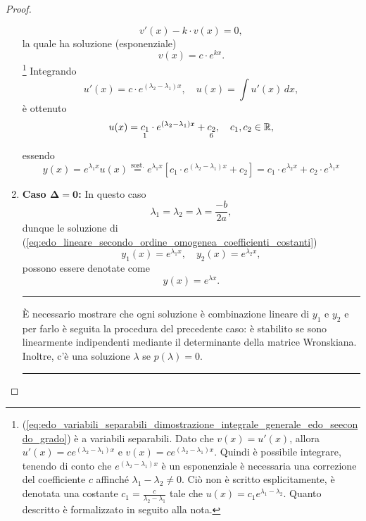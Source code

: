 \begin{proof}
\begin{enumerate}
\begin{equation}
			v'(x) - k \cdot v(x)=0,
		\end{equation}
		la quale ha soluzione (esponenziale)
		\begin{equation*}
			v(x) = c \cdot e^{kx}.
		\end{equation*}
		\footnote{(\ref{eq:edo_variabili_separabili_dimostrazione_integrale_generale_edo_seecondo_grado}) è a variabili separabili. Dato che $v(x)=u'(x)$, allora $u'(x)=ce^{(\lambda_2-\lambda_1)x}$ e $v(x)=ce^{(\lambda_2-\lambda_1)x}$. Quindi è possibile integrare, tenendo di conto che $e^{(\lambda_2-\lambda_1)x}$ è un esponenziale è necessaria una correzione del coefficiente $c$ affinché $\lambda_1-\lambda_2\neq 0$. Ciò non è scritto esplicitamente, è denotata una costante $c_1=\frac{c}{\lambda_2-\lambda_1}$ tale che $u(x) = c_1 e^{\lambda_1-\lambda_2}$. Quanto descritto è formalizzato in seguito alla nota.} Integrando
		\begin{equation*}
			u'(x)=c\cdot e^{(\lambda_2-\lambda_1)x},\quad u(x)=\int u'(x)\,dx,
		\end{equation*}
		è ottenuto
		\begin{equation*}
			u(x)=\underset{\footnotemark}{c_1}\cdot e^{(\lambda_2-\lambda_1)x}+\underset{\boldsymbol{\footnotemark}}{c_2},\quad c_1,c_2\in\mathbb{R},
		\end{equation*}
		essendo
		\begin{equation*}
			y(x)=e^{\lambda_1 x}u(x)\overset{\text{sost.}}{=}e^{\lambda_1x}\left[c_1\cdot e^{(\lambda_2-\lambda_1)x}+c_2\right] = c_1\cdot e^{\lambda_2 x} + c_2\cdot e^{\lambda_1 x}
		\end{equation*}
		\item \textbf{Caso $\boldsymbol{\Delta=0}$:} In questo caso
		\begin{equation*}
			\lambda_1=\lambda_2=\lambda=\frac{-b}{2a},
		\end{equation*}
		dunque le soluzione di (\ref{eq:edo_lineare_secondo_ordine_omogenea_coefficienti_costanti})
		\begin{equation*}
			y_1(x)=e^{\lambda_1 x},\quad y_2(x) = e^{\lambda_2 x},
		\end{equation*}
		possono essere denotate come
		\begin{equation*}
			y(x) = e^{\lambda x}.
		\end{equation*}
		\hrule\vspace{-2px}
		È necessario mostrare che ogni soluzione è combinazione lineare di $y_1$ e $y_2$ e per farlo è seguita la procedura del precedente caso: è stabilito se sono linearmente indipendenti mediante il determinante della matrice Wronskiana. Inoltre, c'è una soluzione $\lambda$ se $p(\lambda)=0$.
		\hrule\vspace{2px}
		

\end{enumerate}
\end{proof}
